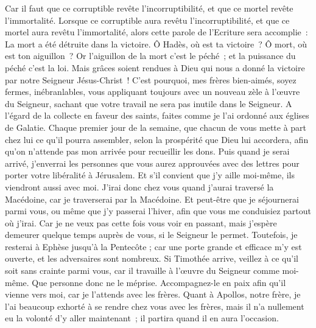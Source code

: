 \begin{multicols}{2}
Car il faut que ce corruptible revête l'incorruptibilité, et que ce mortel revête l'immortalité.
Lorsque ce corruptible aura revêtu l'incorruptibilité, et que ce mortel aura revêtu l'immortalité, alors cette parole de l'Ecriture sera accomplie~: La mort a été détruite dans la victoire.
Ô Hadès, où est ta victoire~? Ô mort, où est ton aiguillon~?
Or l'aiguillon de la mort c'est le péché~; et la puissance du péché c'est la loi.
Mais grâces soient rendues à Dieu qui nous a donné la victoire par notre Seigneur Jésus-Christ~!
C'est pourquoi, mes frères bien-aimés, soyez fermes, inébranlables, vous appliquant toujours avec un nouveau zèle à l'œuvre du Seigneur, sachant que votre travail ne sera pas inutile dans le Seigneur.
\VerseOne{}A l'égard de la collecte en faveur des saints, faites comme je l'ai ordonné aux églises de Galatie.
Chaque premier jour de la semaine, que chacun de vous mette à part chez lui ce qu'il pourra assembler, selon la prospérité que Dieu lui accordera, afin qu'on n'attende pas mon arrivée pour recueillir les dons.
Puis quand je serai arrivé, j'enverrai les personnes que vous aurez approuvées avec des lettres pour porter votre libéralité à Jérusalem.
Et s'il convient que j'y aille moi-même, ils viendront aussi avec moi.
J'irai donc chez vous quand j'aurai traversé la Macédoine, car je traverserai par la Macédoine.
Et peut-être que je séjournerai parmi vous, ou même que j'y passerai l'hiver, afin que vous me conduisiez partout où j'irai.
Car je ne veux pas cette fois vous voir en passant, mais j'espère demeurer quelque temps auprès de vous, si le Seigneur le permet.
Toutefois, je resterai à Ephèse jusqu'à la Pentecôte ;
car une porte grande et efficace m'y est ouverte, et les adversaires sont nombreux.
Si Timothée arrive, veillez à ce qu'il soit sans crainte parmi vous, car il travaille à l'œuvre du Seigneur comme moi-même.
Que personne donc ne le méprise. Accompagnez-le en paix afin qu'il vienne vers moi, car je l'attends avec les frères.
Quant à Apollos, notre frère, je l'ai beaucoup exhorté à se rendre chez vous avec les frères, mais il n'a nullement eu la volonté d'y aller maintenant~; il partira quand il en aura l'occasion.

\end{multicols}
